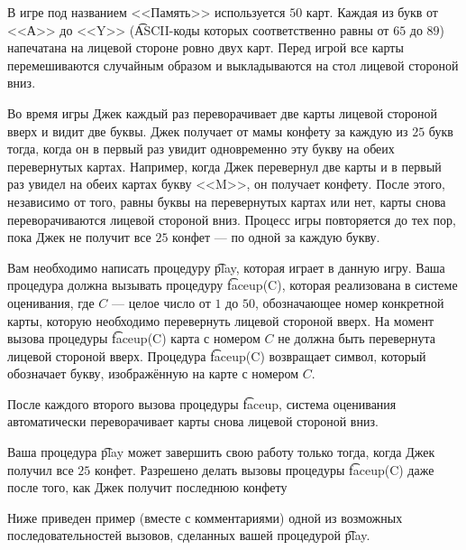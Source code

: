 В игре под названием <<Память>> используется $50$ карт. Каждая из букв от <<А>> до <<Y>> (\t{ASCII}-коды которых соответственно равны от $65$ до $89$) напечатана на лицевой стороне ровно двух карт. Перед игрой все карты перемешиваются случайным образом и выкладываются на стол лицевой стороной вниз.

Во время игры Джек каждый раз переворачивает две карты лицевой стороной вверх и видит две буквы. Джек получает от мамы конфету за каждую из $25$ букв тогда, когда он в первый раз увидит одновременно эту букву на обеих перевернутых картах. Например, когда Джек перевернул две карты и в первый раз увидел на обеих картах букву <<M>>, он получает конфету. После этого, независимо от того, равны буквы на перевернутых картах или нет, карты снова переворачиваются лицевой стороной вниз. Процесс игры повторяется до тех пор, пока Джек не получит все $25$ конфет --- по одной за каждую букву.

Вам необходимо написать процедуру \t{play}, которая играет в данную игру. Ваша процедура должна вызывать процедуру \t{faceup(C)}, которая реализована в системе оценивания, где $C$ --- целое число от $1$ до $50$, обозначающее номер конкретной карты, которую необходимо перевернуть лицевой стороной вверх. На момент вызова процедуры \t{faceup(C)} карта с номером $C$ не должна быть перевернута лицевой стороной вверх. Процедура \t{faceup(C)} возвращает символ, который обозначает букву, изображённую на карте с номером $C$.

После каждого второго вызова процедуры \t{faceup}, система оценивания автоматически переворачивает карты снова лицевой стороной вниз.

Ваша процедура \t{play} может завершить свою работу только тогда, когда Джек получил все $25$ конфет. Разрешено делать вызовы процедуры \t{faceup(C)} даже после того, как Джек получит последнюю конфету

Ниже приведен пример (вместе с комментариями) одной из возможных последовательностей вызовов, сделанных вашей процедурой \t{play}.

